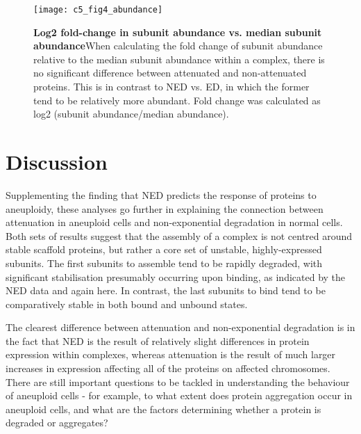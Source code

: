 \documentclass[a4paper,11pt,twoside,openright]{scrbook}
\begin{document}
\begin{figure}[h]
\fcapsideright
    {\caption[Log2 fold-change in subunit abundance vs. median subunit abundance]{\sffamily\textbf{Log2 fold-change in subunit abundance vs. median subunit abundance}\newline \small When calculating the fold change of subunit abundance relative to the median subunit abundance within a complex, there is no significant difference between attenuated and non-attenuated proteins. This is in contrast to NED vs. ED, in which the former tend to be relatively more abundant. Fold change was calculated as log2 (subunit abundance/median abundance).}\label{figure:aneuploidy_abundance}}
    {\texttt{[image: c5\_fig4\_abundance]}}
\end{figure}

\section{Discussion}

Supplementing the finding that NED predicts the response of proteins to aneuploidy, these analyses go further in explaining the connection between attenuation in aneuploid cells and non-exponential degradation in normal cells. Both sets of results suggest that the assembly of a complex is not centred around stable scaffold proteins, but rather a core set of unstable, highly-expressed subunits. The first subunits to assemble tend to be rapidly degraded, with significant stabilisation presumably occurring upon binding, as indicated by the NED data and again here. In contrast, the last subunits to bind tend to be comparatively stable in both bound and unbound states.

The clearest difference between attenuation and non-exponential degradation is in the fact that NED is the result of relatively slight differences in protein expression within complexes, whereas attenuation is the result of much larger increases in expression affecting all of the proteins on affected chromosomes. There are still important questions to be tackled in understanding the behaviour of aneuploid cells - for example, to what extent does protein aggregation occur in aneuploid cells, and what are the factors determining whether a protein is degraded or aggregates?
\end{document}
